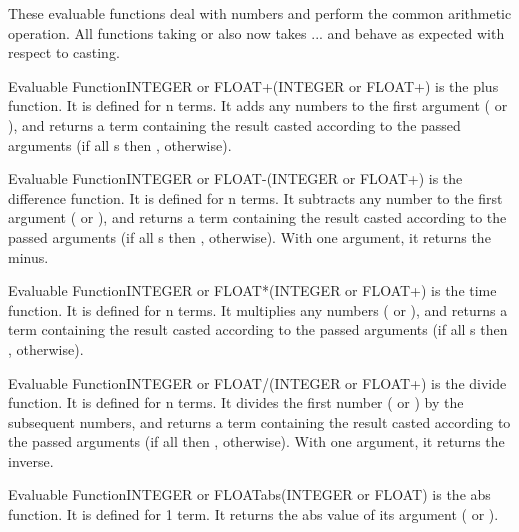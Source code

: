 These evaluable functions deal with numbers and perform the common arithmetic
operation. All functions taking  or  also now
takes ... and behave as expected with respect to casting.

\begin{typeefa}{Evaluable Function}{INTEGER or FLOAT}{+}{({INTEGER or FLOAT}+)}
is the plus function. It is defined for n terms. It adds any numbers to the
first argument ( or ), and returns a term containing
the result casted according to the passed arguments (if all s
then ,  otherwise).
\end{typeefa}

\begin{typeefa}{Evaluable Function}{INTEGER or FLOAT}{-}{({INTEGER or FLOAT}+)}
is the difference function. It is defined for n terms. It subtracts any
number to the first argument ( or ), and returns a term containing
the result casted according to the passed arguments (if all s then ,
 otherwise). With one argument, it returns the minus.
\end{typeefa}

\begin{typeefa}{Evaluable Function}{INTEGER or FLOAT}{*}{({INTEGER or FLOAT}+)}
is the time function. It is defined for n terms. It multiplies any numbers
( or ), and returns a term containing the result casted according
to the passed arguments (if all s then ,  otherwise).
\end{typeefa}

\begin{typeefa}{Evaluable Function}{INTEGER or FLOAT}{/}{({INTEGER or FLOAT}+)}
is the divide function. It is defined for n terms. It divides the first
number ( or ) by the subsequent numbers, and returns a term
containing the result casted according to the passed arguments (if all 
then ,  otherwise). With one argument, it returns the inverse.
\end{typeefa}

\begin{typeefa}{Evaluable Function}{INTEGER or FLOAT}{abs}{({INTEGER or FLOAT})}
is the abs function. It is defined for 1 term. It returns the abs value of
its argument ( or ).
\end{typeefa}

